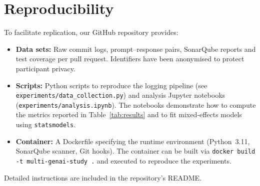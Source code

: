 \documentclass[conference]{IEEEtran}
\begin{document}
\appendix
\section{Reproducibility}
To facilitate replication, our GitHub repository provides:
\begin{itemize}
  \item \textbf{Data sets:} Raw commit logs, prompt–response pairs, SonarQube reports and test coverage per pull request.  Identifiers have been anonymised to protect participant privacy.
  \item \textbf{Scripts:} Python scripts to reproduce the logging pipeline (see \texttt{experiments/data\_collection.py}) and analysis Jupyter notebooks (\texttt{experiments/analysis.ipynb}).  The notebooks demonstrate how to compute the metrics reported in Table \ref{tab:results} and to fit mixed‑effects models using \texttt{statsmodels}.
  \item \textbf{Container:} A Dockerfile specifying the runtime environment (Python 3.11, SonarQube scanner, Git hooks).  The container can be built via \texttt{docker build -t multi-genai-study .} and executed to reproduce the experiments.
\end{itemize}
Detailed instructions are included in the repository’s README.
\end{document}
